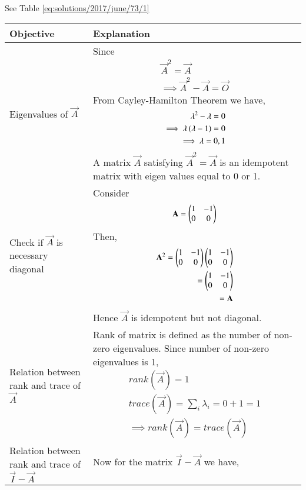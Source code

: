 See Table \ref{eq:solutions/2017/june/73/1}
\begin{table*}[!ht]
        \centering
	\begin{tabular}{|m{2.0in}|m{5.0in}|} \hline
		\textbf{Objective} & \textbf{Explanation} \\ \hline
		Eigenvalues of $\vec{A}$ & Since 
		\begin{align}
			\vec{A}^2=\vec{A} \\
		        \implies \vec{A}^2-\vec{A}=\vec{O}
		\end{align} 
From Cayley-Hamilton Theorem we have,
\begin{align}
        \lambda^2-\lambda=0 \\
        \implies \lambda\left(\lambda-1\right)=0 \\
        \implies \lambda=0,1
\end{align} 
	A matrix $\vec{A}$ satisfying $\vec{A}^2=\vec{A}$ is an idempotent matrix with eigen values
equal to 0 or 1. 	\\ \hline
Check if $\vec{A}$ is necessary diagonal & Consider
                \begin{align}
                        \mathbf{A}=\begin{pmatrix}1&-1\\0&0\end{pmatrix}\\
                \end{align}
                Then,
                \begin{align}
                        \mathbf{A}^2=\begin{pmatrix}1&-1\\0&0\end{pmatrix}\begin{pmatrix}1&-1\\0&0\end{pmatrix}\\
                        =\begin{pmatrix}1&-1\\0&0\end{pmatrix} \\
                        =\mathbf{A}
                \end{align}
                Hence $\vec{A}$ is idempotent but not diagonal. \\ \hline
Relation between rank and trace of $\vec{A}$ & Rank of matrix is defined as the number of non-zero eigenvalues. Since number of non-zero eigenvalues is 1,  
\begin{align} 
	rank(\vec{A})=1 \\
	trace(\vec{A})=\sum_i \lambda_i = 0+1 =1 \\
	\implies rank(\vec{A})=trace(\vec{A})
\end{align} \\ \hline
Relation between rank and trace of $\vec{I}-\vec{A}$ & Now for the matrix $\vec{I}-\vec{A}$ we have,
\begin{align}

\end{align}
\end{tabular}
\end{table*}
